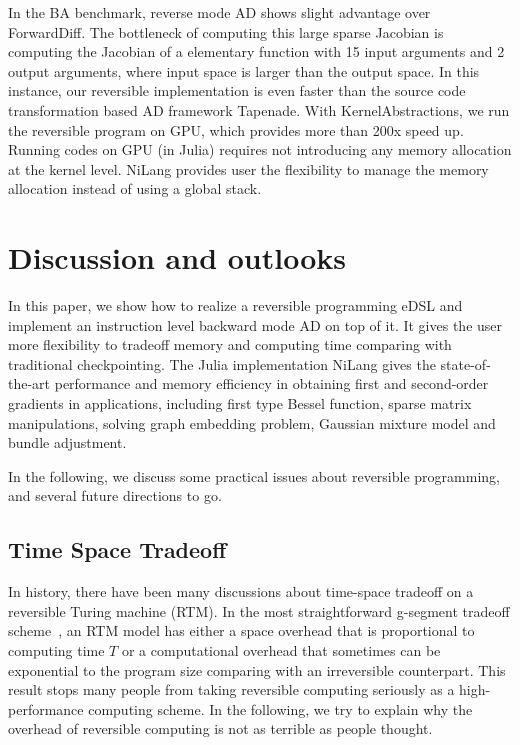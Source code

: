 \documentclass{article}
\newcommand{\<}{\langle}
\renewcommand{\>}{\rangle}
\theoremstyle{definition}\newtheorem{definition}{\textit{Definition}}
\begin{document}
In the BA benchmark, reverse mode AD shows slight advantage over ForwardDiff.
The bottleneck of computing this large sparse Jacobian is computing the Jacobian of a elementary function with 15 input arguments and 2 output arguments, where input space is larger than the output space.
In this instance, our reversible implementation is even faster than the source code transformation based AD framework Tapenade.
With KernelAbstractions, we run the reversible program on GPU, which provides more than 200x speed up.
Running codes on GPU (in Julia) requires not introducing any memory allocation at the kernel level.
NiLang provides user the flexibility to manage the memory allocation instead of using a global stack.

\section{Discussion and outlooks}\label{sec:discussion}
In this paper, we show how to realize a reversible programming eDSL and implement an instruction level backward mode AD on top of it.
It gives the user more flexibility to tradeoff memory and computing time comparing with traditional checkpointing.
The Julia implementation NiLang gives the state-of-the-art performance and memory efficiency in obtaining first and second-order gradients in applications, including first type Bessel function, sparse matrix manipulations, solving graph embedding problem, Gaussian mixture model and bundle adjustment.

In the following, we discuss some practical issues about reversible programming, and several future directions to go.

\subsection{Time Space Tradeoff}\label{sec:timespace}
In history, there have been many discussions about time-space tradeoff on a reversible Turing machine (RTM).
In the most straightforward g-segment tradeoff scheme~\cite{Bennett1989,Levine1990}, an RTM model has either a space overhead that is proportional to computing time $T$ or a computational overhead that sometimes can be exponential to the program size comparing with an irreversible counterpart.
This result stops many people from taking reversible computing seriously as a high-performance computing scheme.
In the following, we try to explain why the overhead of reversible computing is not as terrible as people thought.
\end{document}
